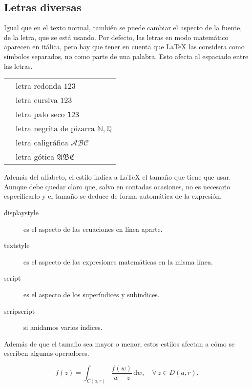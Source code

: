\documentclass{article}
\numberwithin{equation}{section}
\theoremstyle{plain}
\theoremstyle{definition}
\theoremstyle{remark}
\begin{document}
\subsection{Letras diversas}

Igual que en el texto normal, también se puede cambiar el aspecto de la fuente, de la letra, que se está usando. Por defecto, las letras en modo matemático aparecen en itálica, pero hay que tener en cuenta que \LaTeX{} las considera como símbolos separados, no como parte de una palabra. Esto afecta al espaciado entre las letras.
\begin{center}
\begin{tabular}{ll}
\toprule
\texttt{\mathrm{...}} & letra redonda $\mathrm{123}$\\
\texttt{\mathit{...}} & letra cursiva $\mathit{123}$ \\
\texttt{\mathsf{...}} & letra palo seco $\mathsf{123}$ \\
\texttt{\mathbb{...}} & letra negrita de pizarra $\mathbb{N}, \mathbb{Q}$ \\
\texttt{\mathcal{...}} & letra caligráfica $\mathcal{ABC}$ \\
\texttt{\mathfrak{...}} & letra gótica $\mathfrak{ABC}$ \\
\bottomrule
\end{tabular}
\end{center}

Además del alfabeto, el estilo indica a \LaTeX{} el tamaño que tiene que usar. Aunque debe quedar claro que, salvo en contadas ocasiones, no es necesario especificarlo y el tamaño se deduce de forma automática de la expresión.
\begin{description}
    \item[displaystyle] es el aspecto de las ecuaciones en línea aparte.
    \item[textstyle] es el aspecto de las expresiones matemáticas en la misma línea.
    \item[script] es el aspecto de los superíndices y subíndices.
    \item[scripscript] si anidamos varios índices.
\end{description}
Además de que el tamaño sea mayor o menor, estos estilos afectan a cómo se escriben algunas operadores.
\begin{codigo-arriba}
\[ 
	f(z)=\int_{C(a,r)} \frac{f(w)}{w-z} \,\mathrm{d} w, \quad \forall\, z \in D(a,r).
\]
\end{codigo-arriba}
\end{document}

